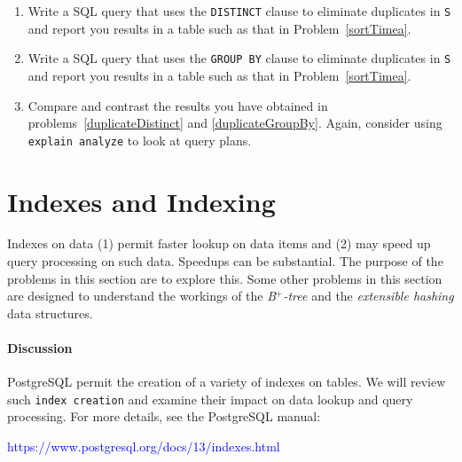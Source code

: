 \documentclass{article}
\newcommand{\blue}[1]{{\color{blue}#1}}
\begin{document}
\begin{enumerate}[resume]
\begin{enumerate}
\item\label{duplicateDistinct} 
Write a SQL query that uses the \blue{\tt DISTINCT} clause to eliminate duplicates in {\tt S} and 
report you results in a table such as that in Problem~\ref{sortTimea}.
\item\label{duplicateGroupBy}  Write a SQL query that uses the \blue{\tt GROUP BY} clause to eliminate duplicates in {\tt S} and 
report you results in a table such as that in Problem~\ref{sortTimea}.
\item Compare and contrast the results you have obtained in problems~\ref{duplicateDistinct} and \ref{duplicateGroupBy}.
Again, consider using \blue{\tt explain analyze} to look at query plans.

\end{enumerate}

\end{enumerate}

\newpage
\section{Indexes and Indexing}
Indexes on data (1) permit faster lookup on data items and (2) may speed up query processing on such data.
Speedups can be substantial.     The purpose of the problems in this section are to explore this.   Some other problems in this section
are designed to understand the workings of the \emph{B$^+$-tree} and the \emph{extensible hashing} data structures.

\paragraph{Discussion}
PostgreSQL permit the creation of a variety of indexes on tables.   We will review such {\tt index creation} and examine their
impact on data lookup and query processing.
For more details, see the PostgreSQL manual:
\begin{center}
\textcolor{blue}{https://www.postgresql.org/docs/13/indexes.html}
\end{center}
\end{document}
